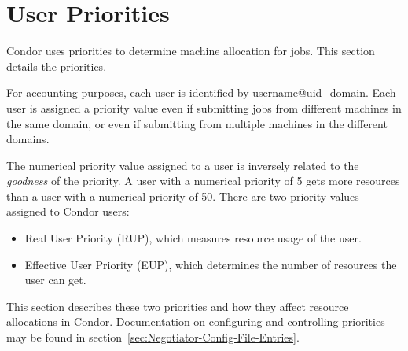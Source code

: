 \section{\label{sec:UserPrio}User Priorities}



Condor uses priorities to determine machine allocation for jobs.
This section details the priorities.

For accounting purposes, each user is identified by username@uid\_domain.
Each user is assigned a priority value even if submitting jobs from
different machines in the same domain, or even if submitting from multiple
machines in the different domains.

The numerical priority value assigned to a user is inversely related to the 
\emph{goodness} of the priority.
A user with a numerical priority of 5 gets 
more resources than a user with a numerical priority of 50.
There are two 
priority values assigned to Condor users:
\begin{itemize}
	\item Real User Priority (RUP), which measures resource usage of the 
		user.
	\item Effective User Priority (EUP), which determines the number of
		resources the user can get.
\end{itemize}
This section describes these two priorities and how they affect resource
allocations in Condor.
Documentation on configuring and controlling 
priorities may be found in section~\ref{sec:Negotiator-Config-File-Entries}.


